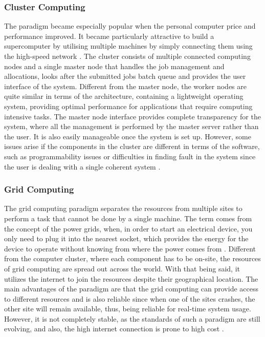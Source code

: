 \documentclass[10pt]{report}
\begin{document}
\subsubsection*{Cluster Computing}

The paradigm became especially popular when the personal computer price and performance improved. It became particularly attractive to build a supercomputer by utilising multiple machines by simply connecting them using the high-speed network \cite{introDS}. The cluster consists of multiple connected computing nodes and a single master node that handles the job management and allocations, looks after the submitted jobs batch queue and provides the user interface of the system. Different from the master node, the worker nodes are quite similar in terms of the architecture, containing a lightweight operating system, providing optimal performance for applications that require computing intensive tasks. The master node interface provides complete transparency for the system, where all the management is performed by the master server rather than the user. It is also easily manageable once the system is set up. However, some issues arise if the components in the cluster are different in terms of the software, such as programmability issues or difficulties in finding fault in the system since the user is dealing with a single coherent system \cite{paradigms}.

\subsubsection*{Grid Computing}

The grid computing paradigm separates the resources from multiple sites to perform a task that cannot be done by a single machine. The term comes from the concept of the power grids, when, in order to start an electrical device, you only need to plug it into the nearest socket, which provides the energy for the device to operate without knowing from where the power comes from \cite{paradComparison}. Different from the computer cluster, where each component has to be on-site, the resources of grid computing are spread out across the world. With that being said, it utilizes the internet to join the resources despite their geographical location. The main advantages of the paradigm are that the grid computing can provide access to different resources and is also reliable since when one of the sites crashes, the other site will remain available, thus, being reliable for real-time system usage. However, it is not completely stable, as the standards of such a paradigm are still evolving, and also, the high internet connection is prone to high cost \cite{paradigms}.
\end{document}
